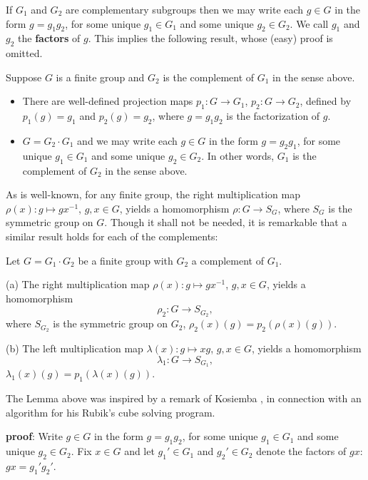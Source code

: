 If $G_1$ and $G_2$ are complementary subgroups then
we may write each $g\in G$ in the form $g=g_1g_2$,
for some unique $g_1\in G_1$ and some unique $g_2\in G_2$. 
We call $g_1$ and $g_2$ the {\bf factors} of $g$. 
This implies the following result, whose (easy) proof
is omitted.

\begin{lemma}
\label{lemma:projections}
Suppose $G$ is a finite group and $G_2$ is the complement of $G_1$
in the sense above.
\begin{itemize}
\item
There are well-defined projection maps
$p_1:G\rightarrow G_1$, $p_2:G\rightarrow G_2$,
defined by $p_1(g)=g_1$ and $p_2(g)=g_2$, where $g=g_1g_2$
is the factorization of $g$.
\item
$G=G_2\cdot G_1$ and we may write each $g\in G$ in the form $g=g_2g_1$,
for some unique $g_1\in G_1$ and some unique $g_2\in G_2$. In other
words, $G_1$ is the complement of $G_2$ in the sense above.
\end{itemize}
\end{lemma}

As is well-known, for any finite group, the right 
multiplication map $\rho(x):g\longmapsto gx^{-1}$,
$g,x\in G$, yields a homomorphism
$\rho:G\rightarrow S_G$,
where $S_G$ is the symmetric group on $G$. Though it shall not be needed,
it is remarkable that a similar result holds for each of the complements:

\begin{lemma} 
\label{lemma:multiplication_mapping}
Let $G=G_1\cdot G_2$ be a finite group with
$G_2$ a complement of $G_1$. 

(a) The right 
multiplication map $\rho(x):g\longmapsto gx^{-1}$,
$g,x\in G$, yields a homomorphism
\[
\rho_2:G\rightarrow S_{G_2},
\]
where $S_{G_2}$ is the symmetric group on $G_2$,
$\rho_2(x)(g)=p_2(\rho(x)(g))$. 

(b) The left multiplication map $\lambda(x):g\longmapsto xg$,
$g,x\in G$, yields a homomorphism
\[
\lambda_1:G\rightarrow S_{G_1},
\]
$\lambda_1(x)(g)=p_1(\lambda(x)(g))$.
\end{lemma}

\begin{remark} The Lemma above was inspired by a remark of
Kosiemba \cite{K}, in connection with an algorithm for his Rubik's 
cube solving program.
\end{remark}

{\bf proof}: 
Write $g\in G$ in the form $g=g_1g_2$,
for some unique $g_1\in G_1$ and some unique $g_2\in G_2$. 
Fix $x\in G$ and
let $g_1'\in G_1$ and $g_2'\in G_2$ denote the factors
of $gx$: $gx=g_1'g_2'$. 

